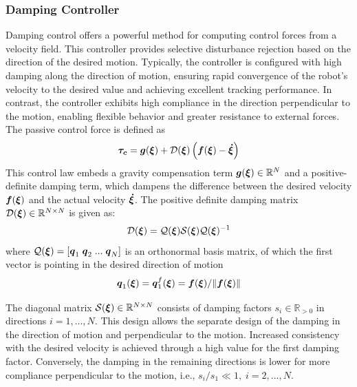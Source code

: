 \subsubsection{Damping Controller}
Damping control \cite{kronander2015passive} offers a powerful method for computing control forces from a velocity field. This controller provides selective disturbance rejection based on the direction of the desired motion. Typically, the controller is configured with high damping along the direction of motion, ensuring rapid convergence of the robot's velocity to the desired value and achieving excellent tracking performance. In contrast, the controller exhibits high compliance in the direction perpendicular to the motion, enabling flexible behavior and greater resistance to external forces. The passive control force is defined as
\begin{equation}
	\boldsymbol{\tau_c} = \boldsymbol{g} (\boldsymbol{\xi}) 
	+ \mathcal{D}(\boldsymbol{\xi}) \left(\boldsymbol{f}(\boldsymbol{\xi}) - \boldsymbol{\dot\xi} \right) 
\label{eq:control_command}
\end{equation}
This control law embeds a gravity compensation term $\boldsymbol{g} (\boldsymbol{\xi}) \in \mathbb{R}^N$ and a positive-definite damping term, which dampens the difference between the desired velocity $\boldsymbol{f}(\boldsymbol{\xi})$ and the actual velocity $\boldsymbol{\dot\xi}$.
The positive definite damping matrix $\mathcal{D}(\boldsymbol{\xi}) \in \mathbb{R}^{N \times N}$ is given as:
\begin{equation}
   \mathcal{D}(\boldsymbol{\xi}) = \mathcal{Q}(\boldsymbol{\xi})\mathcal{S}(\boldsymbol{\xi}) \mathcal{Q} (\boldsymbol{\xi})^{-1}
\label{eq:damping_matrix}
\end{equation}
where $\mathcal{Q}(\boldsymbol{\xi}) = \left[ \boldsymbol{q}_1 \;  \boldsymbol{q}_2  \; ... \; \boldsymbol{q}_N \right] $ is an orthonormal basis matrix, of which the first vector is pointing in the desired direction of motion
\begin{equation}
    \boldsymbol{q}_1(\boldsymbol{\xi}) = \boldsymbol{q}_1^f(\boldsymbol{\xi}) = \boldsymbol{f}({\boldsymbol{\xi}}) / \lVert \boldsymbol{f}({\boldsymbol{\xi}}) \rVert \label{eq:velocity_unit_vector}
\end{equation}

The diagonal matrix $\mathcal{S}(\boldsymbol{\xi}) \in \mathbb{R}^{N \times N}$ consists of damping factors $s_i \in \mathbb{R}_{>0}$ in directions $i = 1, ... , N$.
This design allows the separate design of the damping in the direction of motion and perpendicular to the motion.
Increased consistency with the desired velocity is achieved through a high value for the first damping factor. Conversely, the damping in the remaining directions is lower for more compliance perpendicular to the motion, i.e., $s_i / s_1 \ll 1, \; i = 2,  ... , N$.

